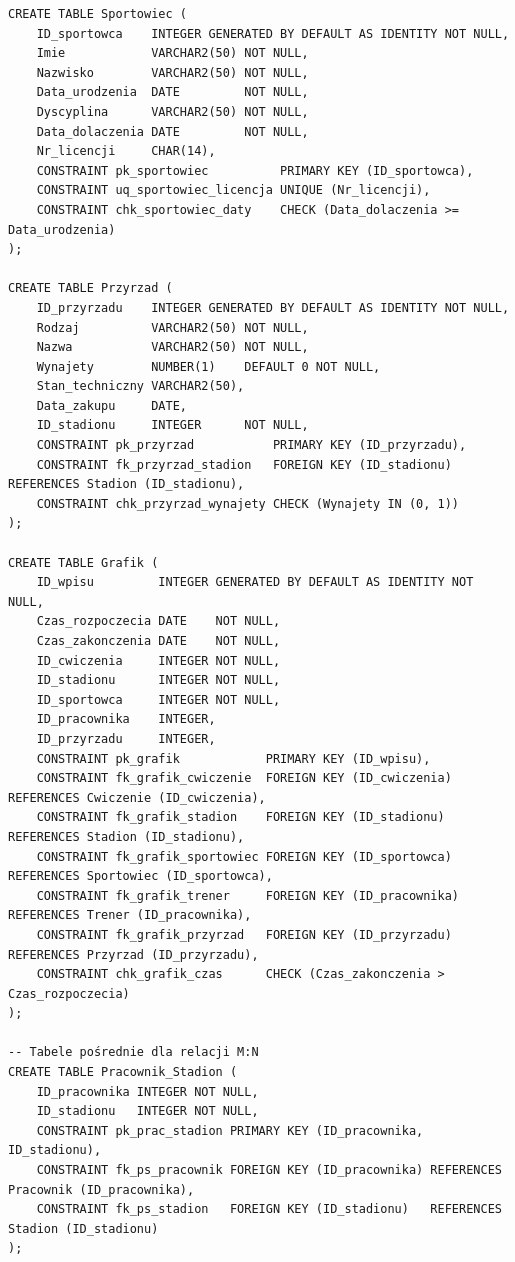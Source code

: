 \documentclass[11pt,a4paper]{article}
\begin{document}
\begin{lstlisting}[basicstyle=\ttfamily\footnotesize, caption={Poprawiony skrypt SQL tworzący strukturę bazy danych}]
CREATE TABLE Sportowiec (
    ID_sportowca    INTEGER GENERATED BY DEFAULT AS IDENTITY NOT NULL,
    Imie            VARCHAR2(50) NOT NULL,
    Nazwisko        VARCHAR2(50) NOT NULL,
    Data_urodzenia  DATE         NOT NULL,
    Dyscyplina      VARCHAR2(50) NOT NULL,
    Data_dolaczenia DATE         NOT NULL,
    Nr_licencji     CHAR(14),
    CONSTRAINT pk_sportowiec          PRIMARY KEY (ID_sportowca),
    CONSTRAINT uq_sportowiec_licencja UNIQUE (Nr_licencji),
    CONSTRAINT chk_sportowiec_daty    CHECK (Data_dolaczenia >= Data_urodzenia)
);

CREATE TABLE Przyrzad (
    ID_przyrzadu    INTEGER GENERATED BY DEFAULT AS IDENTITY NOT NULL,
    Rodzaj          VARCHAR2(50) NOT NULL,
    Nazwa           VARCHAR2(50) NOT NULL,
    Wynajety        NUMBER(1)    DEFAULT 0 NOT NULL,
    Stan_techniczny VARCHAR2(50),
    Data_zakupu     DATE,
    ID_stadionu     INTEGER      NOT NULL,
    CONSTRAINT pk_przyrzad           PRIMARY KEY (ID_przyrzadu),
    CONSTRAINT fk_przyrzad_stadion   FOREIGN KEY (ID_stadionu) REFERENCES Stadion (ID_stadionu),
    CONSTRAINT chk_przyrzad_wynajety CHECK (Wynajety IN (0, 1))
);

CREATE TABLE Grafik (
    ID_wpisu         INTEGER GENERATED BY DEFAULT AS IDENTITY NOT NULL,
    Czas_rozpoczecia DATE    NOT NULL,
    Czas_zakonczenia DATE    NOT NULL,
    ID_cwiczenia     INTEGER NOT NULL,
    ID_stadionu      INTEGER NOT NULL,
    ID_sportowca     INTEGER NOT NULL,
    ID_pracownika    INTEGER,
    ID_przyrzadu     INTEGER,
    CONSTRAINT pk_grafik            PRIMARY KEY (ID_wpisu),
    CONSTRAINT fk_grafik_cwiczenie  FOREIGN KEY (ID_cwiczenia)  REFERENCES Cwiczenie (ID_cwiczenia),
    CONSTRAINT fk_grafik_stadion    FOREIGN KEY (ID_stadionu)   REFERENCES Stadion (ID_stadionu),
    CONSTRAINT fk_grafik_sportowiec FOREIGN KEY (ID_sportowca)  REFERENCES Sportowiec (ID_sportowca),
    CONSTRAINT fk_grafik_trener     FOREIGN KEY (ID_pracownika) REFERENCES Trener (ID_pracownika),
    CONSTRAINT fk_grafik_przyrzad   FOREIGN KEY (ID_przyrzadu)  REFERENCES Przyrzad (ID_przyrzadu),
    CONSTRAINT chk_grafik_czas      CHECK (Czas_zakonczenia > Czas_rozpoczecia)
);

-- Tabele pośrednie dla relacji M:N
CREATE TABLE Pracownik_Stadion (
    ID_pracownika INTEGER NOT NULL,
    ID_stadionu   INTEGER NOT NULL,
    CONSTRAINT pk_prac_stadion PRIMARY KEY (ID_pracownika, ID_stadionu),
    CONSTRAINT fk_ps_pracownik FOREIGN KEY (ID_pracownika) REFERENCES Pracownik (ID_pracownika),
    CONSTRAINT fk_ps_stadion   FOREIGN KEY (ID_stadionu)   REFERENCES Stadion (ID_stadionu)
);


\end{lstlisting}
\end{document}

